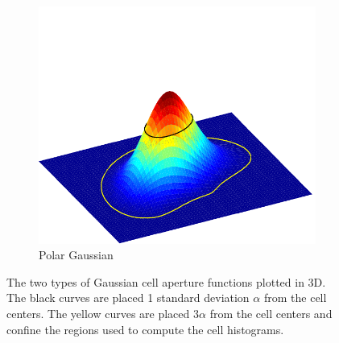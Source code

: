 \documentclass[thesis.tex]{subfiles}
\begin{document}
\begin{figure}[p]
\begin{subfigure}[t]{0.40\textwidth}
		\includegraphics[width=\textwidth, clip=true, trim=0 0 0 90]{img/cellWindowPolar.pdf}
		\caption{Polar Gaussian}
		\label{fig:cellWindowPolar}
	\end{subfigure}
	\caption{The two types of Gaussian cell aperture functions plotted in 3D. The black curves are placed 1 standard deviation $\alpha$ from the cell centers. The yellow curves are placed $3 \alpha$ from the cell centers and confine the regions used to compute the cell histograms.}
	\label{fig:gridWindow}
\end{figure}
%
\end{document}
